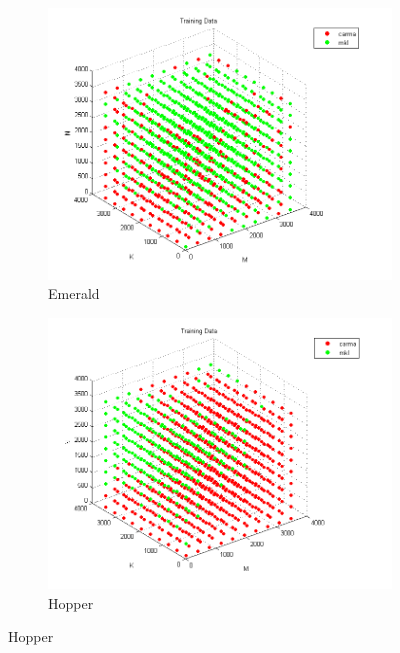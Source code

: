 \begin{figure}[t]
    \centering
        \begin{subfigure}[t]{0.3\textwidth}
            \includegraphics[width=\textwidth]{figures/emerald_train.png}
            \caption{Emerald}
            \label{f:train_emerald}
            \end{subfigure}
        \begin{subfigure}[t]{0.3\textwidth}
            \includegraphics[width=\textwidth]{figures/hopper_train.png}
            \caption{Hopper}
            \label{f:train_hopper}
        \end{subfigure}

\end{figure}
